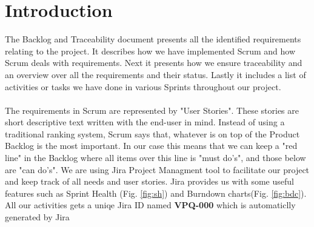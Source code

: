 \section{Introduction}
The Backlog and Traceability document presents all the identified requirements relating to the project. It describes how we have implemented Scrum and how Scrum deals with requirements. Next it presents how we ensure traceability and an overview over all the requirements and their status. Lastly it includes a list of activities or tasks we have done in various Sprints throughout our project. \\
\\
The requirements in Scrum are represented by "User Stories". These stories are short descriptive text written with the end-user in mind. Instead of using a traditional ranking system, Scrum says that, whatever is on top of the Product Backlog is the most important. In our case this means that we can keep a "red line" in the Backlog where all items over this line is "must do's", and those below are "can do's". 
We are using Jira Project Managment tool to facilitate our project and keep track of all needs and user stories. Jira provides us with some useful features such as Sprint Health (Fig. \ref{fig:sh}) and Burndown charts(Fig. \ref{fig:bdc}). All our activities gets a uniqe Jira ID named \textbf{VPQ-000} which is automaticlly generated by Jira \\
\\ 

